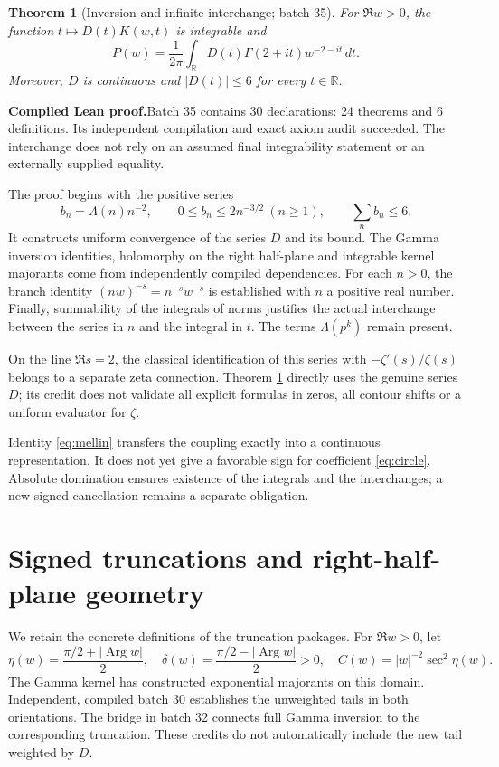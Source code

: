 \documentclass[11pt,a4paper]{article}
\newtheorem{theorem}{Theorem}[section]
\theoremstyle{remark}
\newcommand{\Lam}{\Lambda}
\newcommand{\R}{\mathbb R}
\newcommand{\paid}{\textbf{Compiled Lean proof.}\space}
\DeclareMathOperator{\Arg}{Arg}
\begin{document}
\begin{theorem}[Inversion and infinite interchange; batch 35]\label{thm:mellin}
For $\Re w>0$, the function $t\mapsto D(t)K(w,t)$ is integrable and
\begin{equation}\label{eq:mellin}
P(w)=\frac1{2\pi}\int_{\R}D(t)\Gamma(2+it)w^{-2-it}\,dt.
\end{equation}
Moreover, $D$ is continuous and $|D(t)|\le6$ for every $t\in\R$.
\end{theorem}
\paid Batch 35 contains 30 declarations: 24 theorems and 6 definitions.
Its independent compilation and exact axiom audit succeeded. The interchange
does not rely on an assumed final integrability statement or an externally
supplied equality.

The proof begins with the positive series
\[
b_n=\Lam(n)n^{-2},\qquad
0\le b_n\le 2n^{-3/2}\ (n\ge1),\qquad \sum_n b_n\le6.
\]
It constructs uniform convergence of the series $D$ and its bound.
The Gamma inversion identities, holomorphy on the right half-plane and
integrable kernel majorants come from independently compiled dependencies.
For each $n>0$, the branch identity $(nw)^{-s}=n^{-s}w^{-s}$ is established
with $n$ a positive real number. Finally, summability of the integrals of
norms justifies the actual interchange between the series in $n$ and the
integral in $t$. The terms $\Lam(p^k)$ remain present.

On the line $\Re s=2$, the classical identification of this series with
$-\zeta'(s)/\zeta(s)$ belongs to a separate zeta connection. Theorem
\ref{thm:mellin} directly uses the genuine series $D$; its credit does not
validate all explicit formulas in zeros, all contour shifts or a uniform
evaluator for $\zeta$.

Identity \eqref{eq:mellin} transfers the coupling exactly into a continuous
representation. It does not yet give a favorable sign for coefficient
\eqref{eq:circle}. Absolute domination ensures existence of the integrals
and the interchanges; a new signed cancellation remains a separate obligation.

\clearpage
\section{Signed truncations and right-half-plane geometry}\label{sec:tails}
We retain the concrete definitions of the truncation packages. For
$\Re w>0$, let
\begin{equation}\label{eq:Cdelta}
\eta(w)=\frac{\pi/2+|\Arg w|}{2},\quad
\delta(w)=\frac{\pi/2-|\Arg w|}{2}>0,\quad
C(w)=|w|^{-2}\sec^2\eta(w).
\end{equation}
The Gamma kernel has constructed exponential majorants on this domain.
Independent, compiled batch 30 establishes the unweighted tails in both
orientations. The bridge in batch 32 connects full Gamma inversion to the
corresponding truncation. These credits do not automatically include the
new tail weighted by $D$.
\end{document}
